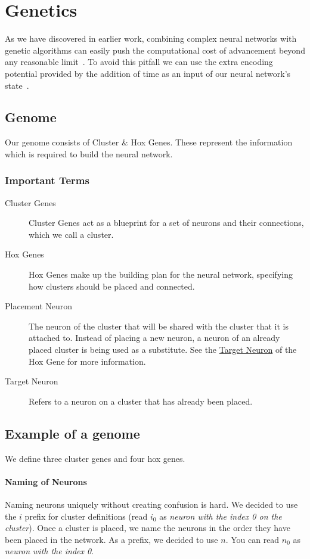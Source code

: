 \section{Genetics}

As we have discovered in earlier work, combining complex neural networks 
with genetic algorithms can easily push the computational cost of advancement
beyond any reasonable limit~\cite{Ferner2017}.
To avoid this pitfall we can use the extra encoding potential provided by 
the addition of time as an input of our neural network's state~\cite{Paugam-Moisy2012}.

\subsection{Genome}
Our genome consists of Cluster \& Hox Genes.
These represent the information which is required to build the neural network.

\subsubsection{Important Terms}
\begin{description}
	\item[Cluster Genes] Cluster Genes act as a blueprint for a set of neurons and their connections, which we call a cluster.
	\item[Hox Genes] Hox Genes make up the building plan for the neural network,
	specifying how clusters should be placed and connected.
	\item[Placement Neuron] The neuron of the cluster that will be shared with the cluster that it is attached to. Instead of placing a new neuron, a neuron of an already placed cluster is being used as a substitute. See the \hyperref[itm:targetneuron]{Target Neuron} of the Hox Gene for more information.
	\item[Target Neuron\label{itm:targetneuron}] Refers to a neuron on a cluster that has already been placed.
\end{description}

\label{Example of a genome}
\subsection{Example of a genome}
We define three cluster genes and four hox genes.

\paragraph{Naming of Neurons}
Naming neurons uniquely without creating confusion is hard. We decided to use the $i$ prefix for cluster definitions (read $i_0$ as \emph{neuron with the index 0 on the cluster}).
Once a cluster is placed, we name the neurons in the order they have been placed in the network. As a prefix, we decided to use $n$. You can read $n_0$ as \emph{neuron with the index 0}.

